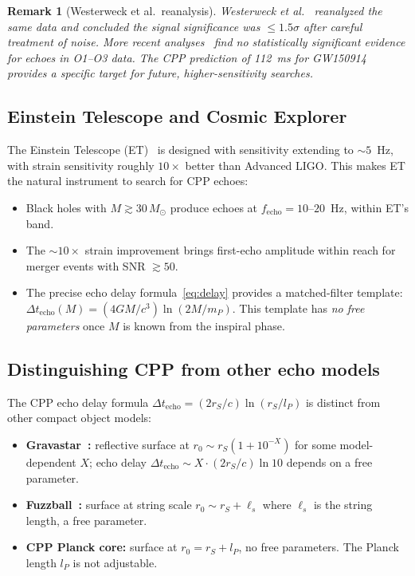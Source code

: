 \documentclass[12pt]{article}
\newtheorem{remark}[theorem]{Remark}
\newcommand{\lP}{l_P}
\newcommand{\mP}{m_P}
\newcommand{\rS}{r_S}
\newcommand{\Dt}{\Delta t_{\mathrm{echo}}}
\begin{document}
\begin{remark}[Westerweck et al.\ reanalysis]
Westerweck et al.~\cite{westerweck2018} reanalyzed the same data and
concluded the signal significance was $\leq\!1.5\sigma$ after careful
treatment of noise.  More recent analyses~\cite{conti2024} find no
statistically significant evidence for echoes in O1--O3 data.  The
CPP prediction of 112~ms for GW150914 provides a specific target for
future, higher-sensitivity searches.
\end{remark}

\subsection{Einstein Telescope and Cosmic Explorer}

The Einstein Telescope (ET)~\cite{et2010} is designed with sensitivity
extending to $\sim\!5$~Hz, with strain sensitivity roughly $10\times$
better than Advanced LIGO.  This makes ET the natural instrument to
search for CPP echoes:

\begin{itemize}[noitemsep]
  \item Black holes with $M \gtrsim 30\,M_\odot$ produce echoes at
    $f_{\mathrm{echo}} = 10$--$20$~Hz, within ET's band.
  \item The $\sim\!10\times$ strain improvement brings first-echo
    amplitude within reach for merger events with SNR $\gtrsim\!50$.
  \item The precise echo delay formula~\eqref{eq:delay} provides a
    matched-filter template: $\Dt(M) = (4GM/c^3)\ln(2M/\mP)$.
    This template has \emph{no free parameters} once $M$ is known
    from the inspiral phase.
\end{itemize}

\subsection{Distinguishing CPP from other echo models}

The CPP echo delay formula $\Dt = (2\rS/c)\ln(\rS/\lP)$ is distinct
from other compact object models:

\begin{itemize}[noitemsep]
  \item \textbf{Gravastar~\cite{mazur2001}:} reflective surface at
    $r_0 \sim \rS(1 + 10^{-X})$ for some model-dependent $X$; echo
    delay $\Dt \sim X\cdot(2\rS/c)\ln 10$ depends on a free parameter.
  \item \textbf{Fuzzball~\cite{skenderis2007}:} surface at string scale
    $r_0 \sim \rS + \ell_s$ where $\ell_s$ is the string length, a free
    parameter.
  \item \textbf{CPP Planck core:} surface at $r_0 = \rS + \lP$, no free
    parameters.  The Planck length $\lP$ is not adjustable.
\end{itemize}
\end{document}
